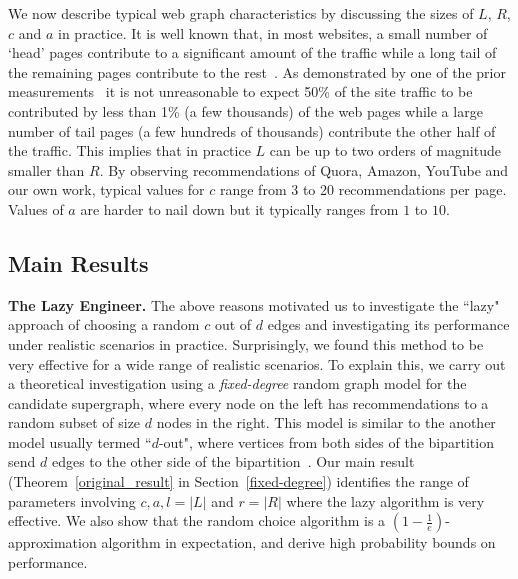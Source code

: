 We now describe typical web graph characteristics by discussing the sizes of $L$, $R$, $c$ and $a$ in practice. It is well known
that, in most websites,  a small number of `head' pages contribute to a
significant amount of the traffic while a long tail of the remaining
pages contribute to the rest~\cite{HubermanAdamic1999, DuDemmerBrewer2006}. As
demonstrated by one of the prior measurements~\cite{KumarNorrisSun2009}
it is not unreasonable to expect 50\% of the site traffic to be
contributed by less than 1\% (a few thousands) of the web pages while a
large number of tail pages (a few hundreds of thousands) contribute
the other half of the traffic. This implies that in practice $L$ can
be up to two orders of magnitude smaller than $R$.  By observing
recommendations of Quora, Amazon, YouTube and our own work, 
typical values for $c$ range from 3 to 20 recommendations per page. Values of $a$ are harder to nail down but it typically ranges from $1$ to $10$. \vs


\subsection{Main Results}

{\bf The Lazy Engineer.} The above reasons motivated us to
investigate the ``lazy" approach of choosing a random $c$ out of $d$ edges
and investigating its performance under realistic scenarios in practice.  
Surprisingly, we found this method to be very effective for a wide range of realistic scenarios. To explain this, we carry out a theoretical investigation using
a {\em fixed-degree} random graph model for the candidate supergraph, where every
node on the left has recommendations to a random subset of size $d$ nodes in the right. This model is similar to the another model usually termed ``$d$-out", where vertices from both sides of the bipartition send $d$
edges to the other side of the bipartition~\cite{FriezePittel2004}. Our main result
(Theorem~\ref{original_result} in Section~\ref{fixed-degree}) identifies the range of parameters involving $c,a,l=|L|$ and $r =|R|$ where the lazy algorithm is very effective. We also show that the random choice algorithm is a $(1-\frac1e)$- approximation algorithm in expectation, and derive high probability bounds on performance.\vs


